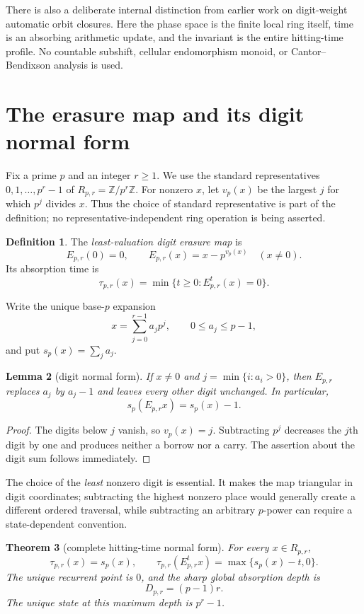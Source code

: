\documentclass[11pt,a4paper]{amsart}
\newtheorem{theorem}{Theorem}[section]
\newtheorem{lemma}[theorem]{Lemma}
\theoremstyle{definition}
\newtheorem{definition}[theorem]{Definition}
\theoremstyle{remark}
\newcommand{\Z}{\mathbb Z}
\begin{document}
There is also a deliberate internal distinction from earlier work on
digit-weight automatic orbit closures.  Here the phase space is the finite
local ring itself, time is an absorbing arithmetic update, and the invariant
is the entire hitting-time profile.  No countable subshift, cellular
endomorphism monoid, or Cantor--Bendixson analysis is used.

\section{The erasure map and its digit normal form}

Fix a prime $p$ and an integer $r\geq1$.  We use the standard representatives
$0,1,\ldots,p^r-1$ of $R_{p,r}=\Z/p^r\Z$.  For nonzero $x$, let $v_p(x)$ be
the largest $j$ for which $p^j$ divides $x$.  Thus the choice of standard
representative is part of the definition; no representative-independent ring
operation is being asserted.

\begin{definition}
The \emph{least-valuation digit erasure map} is
\[
 E_{p,r}(0)=0,
 \qquad
 E_{p,r}(x)=x-p^{v_p(x)}\quad (x\ne0).
\]
Its absorption time is
\[
 \tau_{p,r}(x)=\min\{t\geq0:E_{p,r}^t(x)=0\}.
\]
\end{definition}

Write the unique base-$p$ expansion
\[
 x=\sum_{j=0}^{r-1}a_jp^j,
 \qquad 0\leq a_j\leq p-1,
\]
and put $s_p(x)=\sum_ja_j$.

\begin{lemma}[digit normal form]\label{lem:normal}
If $x\ne0$ and $j=\min\{i:a_i>0\}$, then $E_{p,r}$ replaces $a_j$ by
$a_j-1$ and leaves every other digit unchanged.  In particular,
\[
 s_p(E_{p,r}x)=s_p(x)-1.
\]
\end{lemma}

\begin{proof}
The digits below $j$ vanish, so $v_p(x)=j$.  Subtracting $p^j$ decreases the
$j$th digit by one and produces neither a borrow nor a carry.  The assertion
about the digit sum follows immediately.
\end{proof}

The choice of the \emph{least} nonzero digit is essential.  It makes the
map triangular in digit coordinates; subtracting the highest nonzero place
would generally create a different ordered traversal, while subtracting an
arbitrary $p$-power can require a state-dependent convention.

\begin{theorem}[complete hitting-time normal form]\label{thm:hitting}
For every $x\in R_{p,r}$,
\[
 \tau_{p,r}(x)=s_p(x),
 \qquad
 \tau_{p,r}(E_{p,r}^t x)=\max\{s_p(x)-t,0\}.
\]
The unique recurrent point is $0$, and the sharp global absorption depth is
\[
 D_{p,r}=(p-1)r.
\]
The unique state at this maximum depth is $p^r-1$.
\end{theorem}
\end{document}
